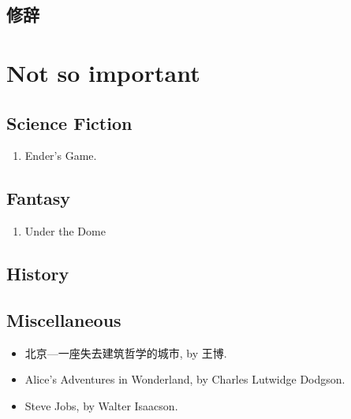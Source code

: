 \documentclass{article}
\begin{document}
\subsection{修辞}
\section{Not so important}
\subsection{Science Fiction}
\begin{enumerate}
    \item Ender's Game.
\end{enumerate}
\subsection{Fantasy}
\begin{enumerate}
    \item Under the Dome
\end{enumerate}
\subsection{History}

\subsection{Miscellaneous}
\begin{itemize}
    \item 北京---一座失去建筑哲学的城市, by 王博.
    \item Alice's Adventures in Wonderland, by Charles Lutwidge Dodgson.
    \item Steve Jobs, by Walter Isaacson.
\end{itemize}
\end{document}
